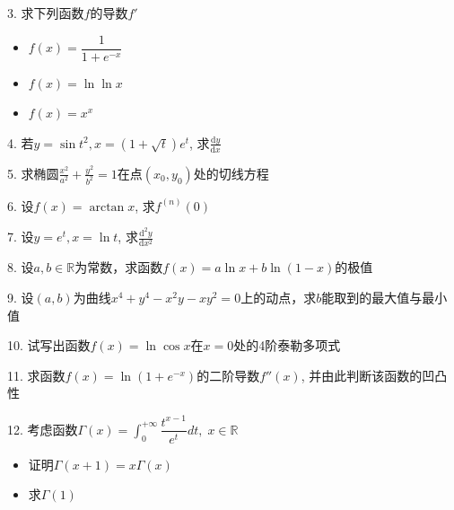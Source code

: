 
\begin{frame}

3. 求下列函数$f$的导数$f'$
\begin{itemize}
\item[(1)] $f(x) = \dfrac{1}{1+e^{-x}}$
\item[(2)] $f(x) = \ln\ln x$
\item[(3)] $f(x) = x^x$
\end{itemize}

\vspace{1em}

4. 若$y = \sin t^2, x = (1 + \sqrt{t})e^t$, 求$\frac{\mathrm{d}y}{\mathrm{d}x}$

\vspace{1em}

5. 求椭圆$\frac{x^2}{a^2} + \frac{y^2}{b^2} = 1$在点$(x_0,y_0)$处的切线方程

\vspace{1em}

6. 设$f(x) = \arctan x$, 求$f^{(n)}(0)$

\vspace{1em}

7. 设$y = e^t, x = \ln t$, 求$\frac{\mathrm{d}^2y}{\mathrm{d}x^2}$

\end{frame}


\begin{frame}

8. 设$a,b\in\mathbb{R}$为常数，求函数$f(x) = a \ln x + b \ln (1-x)$的极值

\vspace{1em}

9. 设$(a,b)$为曲线$x^4+y^4-x^2y-xy^2 = 0$上的动点，求$b$能取到的最大值与最小值

\vspace{1em}

10. 试写出函数$f(x) = \ln\cos x$在$x=0$处的4阶泰勒多项式

\vspace{1em}

11. 求函数$f(x) = \ln(1+e^{-x})$的二阶导数$f''(x)$, 并由此判断该函数的凹凸性

\vspace{1em}

12. 考虑函数$\displaystyle \Gamma(x) = \int_0^{+\infty} \dfrac{t^{x-1}}{e^t} dt, \; x\in\mathbb{R}$
\begin{itemize}
\item[(1)] 证明$\Gamma(x+1) = x\Gamma(x)$
\item[(2)] 求$\Gamma(1)$
\end{itemize}

\end{frame}

